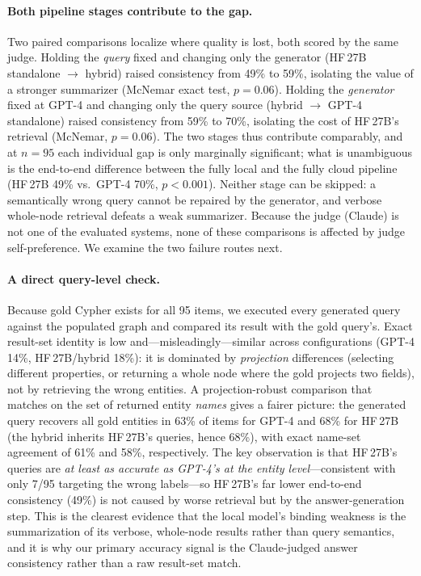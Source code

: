 \documentclass{ceurart}
\begin{document}
\paragraph{Both pipeline stages contribute to the gap.}
Two paired comparisons localize where quality is lost, both scored by the same
judge. Holding the \emph{query} fixed and changing only the generator (HF\,27B
standalone $\to$ hybrid) raised consistency from 49\% to 59\%, isolating the value
of a stronger summarizer (McNemar exact test, $p=0.06$). Holding the \emph{generator}
fixed at GPT-4 and changing only the query source (hybrid $\to$ GPT-4 standalone)
raised consistency from 59\% to 70\%, isolating the cost of HF\,27B's retrieval
(McNemar, $p=0.06$). The two stages thus contribute comparably, and at $n=95$ each
individual gap is only marginally significant; what is unambiguous is the
end-to-end difference between the fully local and the fully cloud pipeline
(HF\,27B 49\% vs.\ GPT-4 70\%, $p<0.001$). Neither stage can be skipped: a
semantically wrong query cannot be repaired by the generator, and verbose
whole-node retrieval defeats a weak summarizer. Because the judge (Claude) is not
one of the evaluated systems, none of these comparisons is affected by judge
self-preference. We examine the two failure routes next.

\paragraph{A direct query-level check.}
Because gold Cypher exists for all 95 items, we executed every generated query
against the populated graph and compared its result with the gold query's. Exact
result-set identity is low and---misleadingly---similar across configurations
(GPT-4 14\%, HF\,27B/hybrid 18\%): it is dominated by \emph{projection}
differences (selecting different properties, or returning a whole node where the
gold projects two fields), not by retrieving the wrong entities. A
projection-robust comparison that matches on the set of returned entity
\emph{names} gives a fairer picture: the generated query recovers all gold entities
in 63\% of items for GPT-4 and 68\% for HF\,27B (the hybrid inherits HF\,27B's
queries, hence 68\%), with exact name-set agreement of 61\% and 58\%,
respectively. The key observation is that HF\,27B's queries are \emph{at least as
accurate as GPT-4's at the entity level}---consistent with only 7/95 targeting the
wrong labels---so HF\,27B's far lower end-to-end consistency (49\%) is not caused
by worse retrieval but by the answer-generation step. This is the clearest evidence
that the local model's binding weakness is the summarization of its verbose,
whole-node results rather than query semantics, and it is why our primary accuracy
signal is the Claude-judged answer consistency rather than a raw result-set match.
\end{document}
